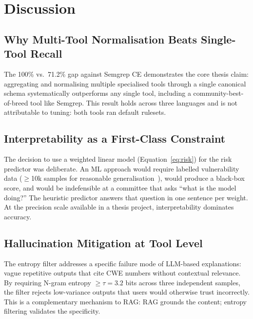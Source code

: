 \documentclass[conference]{IEEEtran}
\begin{document}
\section{Discussion}
\label{sec:discussion}

\subsection{Why Multi-Tool Normalisation Beats Single-Tool Recall}

The 100\% vs.\ 71.2\% gap against Semgrep CE demonstrates the core thesis claim: aggregating and normalising multiple specialised tools through a single canonical schema systematically outperforms any single tool, including a community-best-of-breed tool like Semgrep. This result holds across three languages and is not attributable to tuning: both tools ran default rulesets.

\subsection{Interpretability as a First-Class Constraint}

The decision to use a weighted linear model (Equation~\ref{eq:risk}) for the risk predictor was deliberate. An ML approach would require labelled vulnerability data ($\geq$10k samples for reasonable generalisation~\cite{croft2023data}), would produce a black-box score, and would be indefensible at a committee that asks ``what is the model doing?'' The heuristic predictor answers that question in one sentence per weight. At the precision scale available in a thesis project, interpretability dominates accuracy.

\subsection{Hallucination Mitigation at Tool Level}

The entropy filter addresses a specific failure mode of LLM-based explanations: vague repetitive outputs that cite CWE numbers without contextual relevance. By requiring N-gram entropy $\geq \tau = 3.2$ bits across three independent samples, the filter rejects low-variance outputs that users would otherwise trust incorrectly. This is a complementary mechanism to RAG: RAG grounds the content; entropy filtering validates the specificity.
\end{document}
